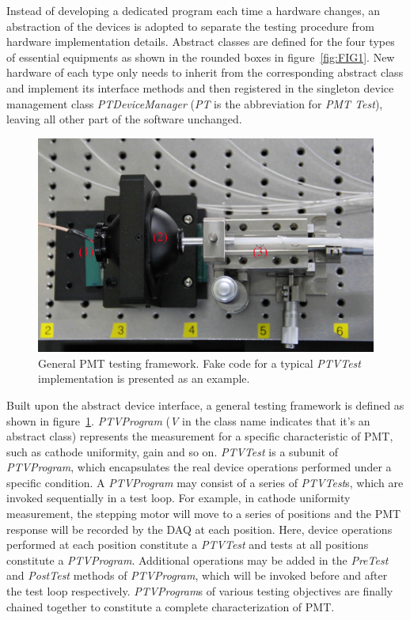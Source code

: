 \documentclass{JINST}
\begin{document}
Instead of developing a dedicated program each time a hardware changes, an abstraction of the devices is adopted to separate the testing procedure from hardware implementation details. 
Abstract classes are defined for the four types of essential equipments as shown in the rounded boxes in figure~\ref{fig:FIG1}.
New hardware of each type only needs to inherit from the corresponding abstract class and implement its interface methods and then registered in the singleton device management class \textit{PTDeviceManager} (\textit{PT} is the abbreviation for \textit{PMT Test}), leaving all other part of the software unchanged.

\begin{figure}[tbp]
	\centering
	\includegraphics[width=120mm]{FIG4}
	\caption{General PMT testing framework.
		Fake code for a typical \textit{PTVTest} implementation is presented as an example.}
	\label{fig:FIG4}
\end{figure}

Built upon the abstract device interface, a general testing framework is defined as shown in figure~\ref{fig:FIG4}.
\textit{PTVProgram} (\textit{V} in the class name indicates that it's an abstract class) represents the measurement for a specific characteristic of PMT, such as cathode uniformity, gain and so on.
\textit{PTVTest} is a subunit of \textit{PTVProgram}, which encapsulates the real device operations performed under a specific condition.
A \textit{PTVProgram} may consist of a series of \textit{PTVTest}s, which are invoked sequentially in a test loop.
For example, in cathode uniformity measurement, the stepping motor will move to a series of positions and the PMT response will be recorded by the DAQ at each position.
Here, device operations performed at each position constitute a \textit{PTVTest} and tests at all positions constitute a \textit{PTVProgram}.
Additional operations may be added in the \textit{PreTest} and \textit{PostTest} methods of \textit{PTVProgram}, which will be invoked before and after the test loop respectively.
\textit{PTVProgram}s of various testing objectives are finally chained together to constitute a complete characterization of PMT.
\end{document}
